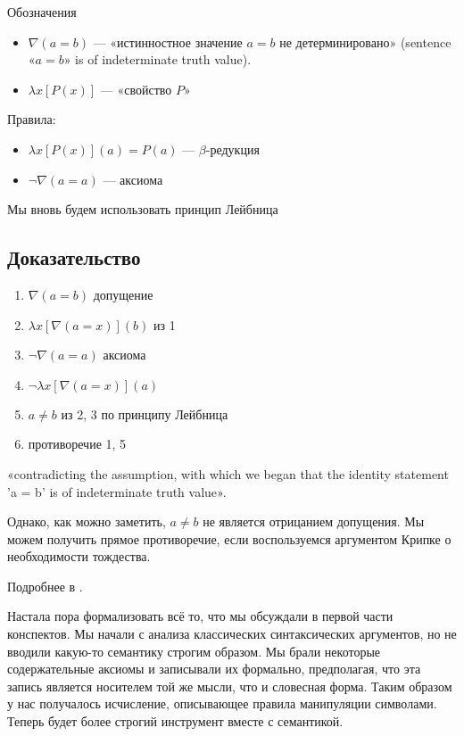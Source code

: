 \documentclass[openany]{book}
\theoremstyle{plain}
\theoremstyle{definition}
\begin{document}
Обозначения
\begin{itemize}
\item \(\nabla (a = b)\) — «истинностное значение \(a = b\) не детерминировано» (sentence «\(a = b\)» is of indeterminate truth value).
\item \(\lambda x [P(x)]\) — «свойство \(P\)»
\end{itemize}

Правила:
\begin{itemize}
\item \(\lambda x [P(x)](a) = P(a)\) — \(\beta\)-редукция
\item \(\neg \nabla (a = a)\) — аксиома
\end{itemize}

Мы вновь будем использовать принцип Лейбница

\subsection{ Доказательство }
\begin{enumerate}
\item \(\nabla (a = b)\) допущение
\item \(\lambda x [\nabla(a = x)](b)\) из 1
\item \(\neg \nabla(a = a)\) аксиома
\item \(\neg \lambda x [\nabla(a = x)](a)\)
\item \(a \not= b\) из 2, 3 по принципу Лейбница
\item противоречие 1, 5
\end{enumerate}
 
«contradicting the assumption, with which we began that the identity statement 'a = b' is of indeterminate truth value».

Однако, как можно заметить, \(a \not= b\) не является отрицанием допущения. Мы можем получить прямое противоречие, если воспользуемся аргументом Крипке о необходимости тождества.

Подробнее в \cite{Evans}.




Настала пора формализовать всё то, что мы обсуждали в первой части конспектов. Мы начали с анализа классических синтаксических аргументов, но не вводили какую-то семантику строгим образом. Мы брали некоторые содержательные аксиомы и записывали их формально, предполагая, что эта запись является носителем той же мысли, что и словесная форма. Таким образом у нас получалось исчисление, описывающее правила манипуляции символами. Теперь будет более строгий инструмент вместе с семантикой.
\end{document}
